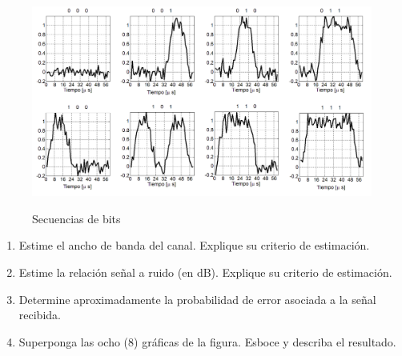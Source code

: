 \begin{enumerate}
\begin{enumerate}
\vspace{200px}
\begin{figure}[h!]
	\captionsetup{justification = raggedright, singlelinecheck = false}
	\caption{Secuencias de bits} 
	\centering
	\includegraphics[scale=0.4]{Imagenes/eyepattern1.png}
	\label{fig:eyepattern1}
\end{figure}



\begin{enumerate}
	\item Estime el ancho de banda del canal. Explique su criterio de estimación.
	
	\item Estime la relación señal a ruido (en dB). Explique su criterio de estimación.
	
	\item Determine aproximadamente la probabilidad de error asociada a la señal recibida.
	
	\item  Superponga las ocho (8) gráficas de la figura. Esboce y describa el resultado. 





\end{enumerate}
\end{enumerate}
\end{enumerate}
